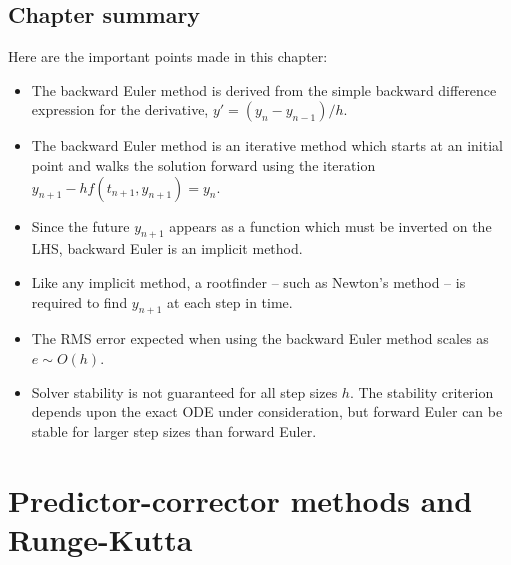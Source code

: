 \documentclass[hidelinks,notitlepage]{book}
\begin{document}
\section{Chapter summary}
Here are the important points made in this chapter:
\begin{itemize}
	\item The backward Euler method is derived from the simple backward difference expression for the derivative, $y' = (y_{n} - y_{n-1})/h$.
	\item The backward Euler method is an iterative method which starts at an initial point and walks the solution forward using the iteration 
	$y_{n+1} - h f(t_{n+1}, y_{n+1}) = y_{n}$.
	\item Since the future $y_{n+1}$ appears as a function which must be inverted on the LHS, backward Euler is an implicit method.
	\item Like any implicit method, a rootfinder -- such as Newton's method -- is required to find $y_{n+1}$ at each step in time.  
	\item The RMS error expected when using the backward Euler method scales as $e \sim O(h)$.
	\item Solver stability is not guaranteed for all step sizes $h$.  The stability criterion depends upon the exact ODE under consideration, but forward Euler can be stable for larger step sizes than forward Euler.
\end{itemize}

\chapter{Predictor-corrector methods and Runge-Kutta}
\end{document}

